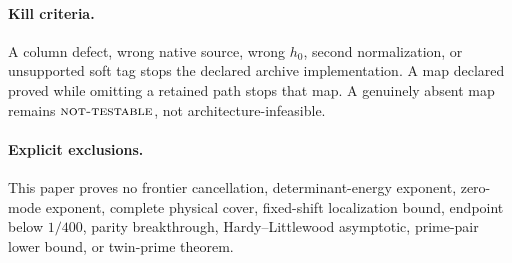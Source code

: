 \documentclass[11pt]{article}
\theoremstyle{definition}
\theoremstyle{remark}
\newcommand{\NT}{\textsc{not-testable}}
\begin{document}
\paragraph{Kill criteria.}
A column defect, wrong native source, wrong \(h_0\), second
normalization, or unsupported soft tag stops the declared archive
implementation.  A map declared proved while omitting a retained path
stops that map.  A genuinely absent map remains \(\NT\), not
architecture-infeasible.

\paragraph{Explicit exclusions.}
This paper proves no frontier cancellation, determinant-energy
exponent, zero-mode exponent, complete physical cover, fixed-shift
localization bound, endpoint below \(1/400\), parity breakthrough,
Hardy--Littlewood asymptotic, prime-pair lower bound, or twin-prime
theorem.

\begingroup
\small
\setlength{\bibsep}{2pt plus 0.3ex}


\endgroup
\end{document}
